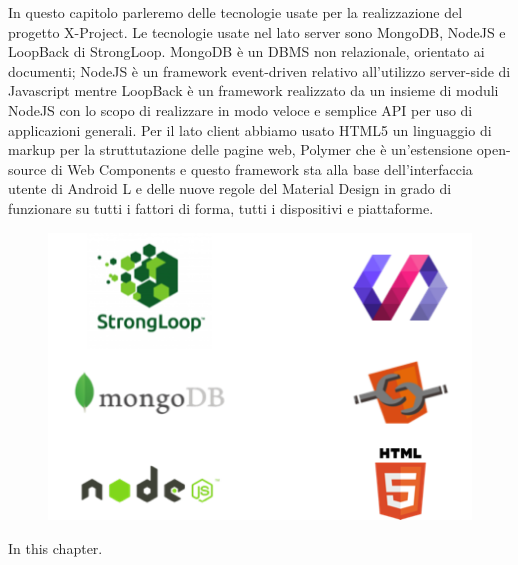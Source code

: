 In questo capitolo parleremo delle tecnologie usate per la realizzazione del progetto X-Project.
Le tecnologie usate nel lato server sono MongoDB, NodeJS e LoopBack di StrongLoop. MongoDB è un DBMS non relazionale, orientato ai documenti; NodeJS è un framework event-driven relativo all'utilizzo server-side di Javascript mentre LoopBack è un framework realizzato da un insieme di moduli NodeJS con lo scopo di realizzare in modo veloce e semplice API per uso di applicazioni generali.
Per il lato client abbiamo usato HTML5 un linguaggio di markup per la struttutazione delle pagine web, Polymer che è un'estensione open-source di Web Components e questo framework sta alla base dell'interfaccia utente di Android L e delle nuove regole del Material Design in grado di funzionare su tutti i fattori di forma, tutti i dispositivi e piattaforme.


\begin {figure}[h]
\graphicspath{{images/chapter_TCH/}}
\includegraphics[width=\textwidth]{stack_tch}
\end {figure}


In this chapter.